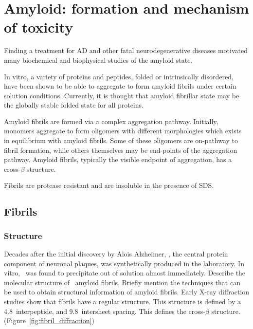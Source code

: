 \section{Amyloid: formation and mechanism of toxicity}
  \begin{outline}[enumerate]
    \1 Finding a treatment for AD and other fatal neurodegenerative diseases motivated many biochemical and biophysical studies of the amyloid state.  
    
    \1 In vitro, a variety of proteins and peptides, folded or intrinsically disordered, have been shown to be able to aggregate to form amyloid fibrils under certain solution conditions. Currently, it is thought that amyloid fibrillar state may be the globally stable folded state for all proteins.

    \1 Amyloid fibrils are formed via a complex aggregation pathway. Initially, monomers aggregate to form oligomers with different morphologies which exists in equilibrium with amyloid fibrils. Some of these oligomers are on-pathway to fibril formation, while others themselves may be end-points of the aggregation pathway. Amyloid fibrils, typically the visible endpoint of aggregation, has a cross-$\beta$ structure.
    
    \1 Fibrils are protease resistant and are insoluble in the presence of SDS.
  \end{outline}

 \subsection{Fibrils}
    \subsubsection{Structure} %
    \label{ssub:structure}

   \begin{outline}

    \1 Decades after the initial discovery by Alois Alzheimer, \abeta, the central protein component of neuronal plaques, was synthetically produced in the laboratory. In vitro, \abeta\ was found to precipitate out of solution almost immediately. 
  		\2 Describe the molecular structure of \abeta\ amyloid fibrils. Briefly mention the techniques that can be used to obtain structural information of amyloid fibrils. Early X-ray diffraction studies show that fibrils have a regular structure.  This structure is defined by a 4.8\angstrom\ interpeptide, and 9.8\angstrom\ intersheet spacing. This defines the cross-$\beta$ structure. (Figure~\ref{fig:fibril_diffraction})
  	\end{outline}

